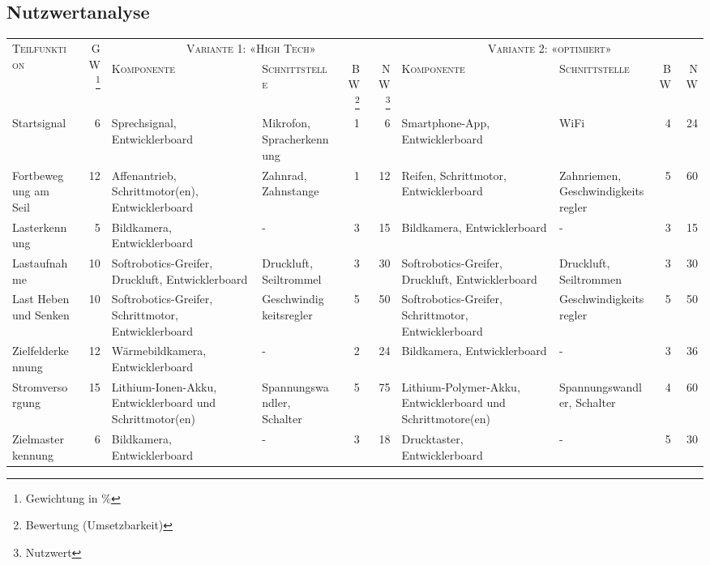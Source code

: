 \documentclass[a4paper,11pt]{scrartcl}
\begin{document}
\begin{landscape}
\section{Nutzwertanalyse}
\label{lbl:Nutzwertanalyse}

\begin{tabularx}{\linewidth}{|X|r|X|X|r|r|X|X|r|r|}
\hline
\multirow{2}{*}{\textsc{Teilfunktion}} & \multirow{2}{*}{\textsc{GW} \footnote{Gewichtung in \%}} & \multicolumn{4}{c|}{\textsc{Variante 1: «High Tech»}} & \multicolumn{4}{c|}{\textsc{Variante 2: «optimiert»}} \\
\cline{3-10}
& & \textsc{Komponente} & \textsc{Schnittstelle} & \textsc{BW} \footnote{Bewertung (Umsetzbarkeit)} & \textsc{NW} \footnote{Nutzwert} & \textsc{Komponente} & \textsc{Schnittstelle} & \textsc{BW} & \textsc{NW} \\
\hline
Startsignal & 6 & Sprechsignal, Entwicklerboard & Mikrofon, Spracherkennung & 1 & 6 & Smartphone-App, Entwickler\-board & WiFi & 4 & 24 \\
\hline
Fortbewegung am Seil & 12 & Affenantrieb, Schrittmotor(en), Entwicklerboard & Zahnrad, Zahnstange & 1 & 12 & Reifen, Schrittmotor, Entwicklerboard & Zahnriemen, Geschwindigkeits\-regler & 5 & 60 \\
\hline
Lasterkennung & 5 & Bildkamera, Entwicklerboard & - & 3 & 15 & Bildkamera, Entwicklerboard & - & 3 & 15 \\
\hline
Lastaufnahme & 10 & Softrobotics-Greifer, Druckluft, Entwicklerboard & Druckluft, Seiltrommel & 3 & 30 & Softrobotics-Greifer, Druckluft, Entwicklerboard & Druckluft, Seiltrommen & 3 & 30 \\
\hline
Last Heben und Senken & 10 & Softrobotics-Greifer, Schrittmotor, Entwicklerboard & Geschwindigkeits\-regler & 5 & 50 & Softrobotics-Greifer, Schrittmotor, Entwicklerboard & Geschwindigkeits\-regler & 5 & 50 \\
\hline
Ziel\-feld\-erkennung & 12 & Wärme\-bild\-kamera, Entwickler\-board & - & 2 & 24 & Bildkamera, Entwicklerboard & - & 3 & 36 \\
\hline
Stromversorgung & 15 & Lithium-Ionen-Akku, Entwicklerboard und Schrittmotor(en) & Spannungs\-wandler, Schalter & 5 & 75 & Lithium-Polymer-Akku, Entwicklerboard und Schrittmotore(en) & Spannungs\-wandler, Schalter & 4 & 60 \\
\hline
Zielmast\-erkennung & 6 & Bildkamera, Entwicklerboard & - & 3 & 18 & Drucktaster, Entwicklerboard & - & 5 & 30 \\

\end{tabularx}
\end{landscape}
\end{document}

